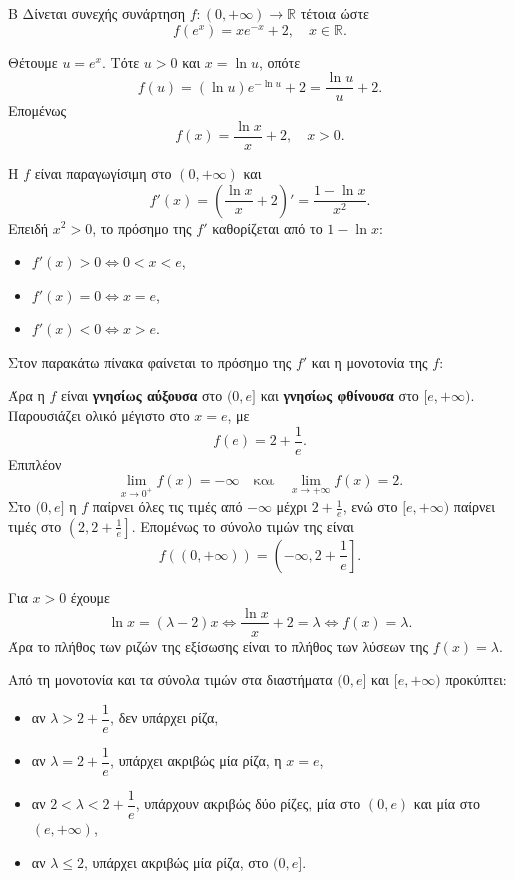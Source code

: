 
\begin{thema}{Β}
Δίνεται συνεχής συνάρτηση $f:(0,+\infty)\to\mathbb{R}$ τέτοια ώστε
\[
f(e^x)=xe^{-x}+2,\quad x\in\mathbb{R}.
\]

\begin{erwthma}
\item Θέτουμε $u=e^x$. Τότε $u>0$ και $x=\ln u$, οπότε
\[
f(u)=(\ln u)e^{-\ln u}+2=\frac{\ln u}{u}+2.
\]
Επομένως
\[
f(x)=\frac{\ln x}{x}+2,\quad x>0.
\]

\item Η $f$ είναι παραγωγίσιμη στο $(0,+\infty)$ και
\[
f'(x)=\left(\frac{\ln x}{x}+2\right)'=\frac{1-\ln x}{x^2}.
\]
Επειδή $x^2>0$, το πρόσημο της $f'$ καθορίζεται από το $1-\ln x$:
\begin{itemize}
\item $f'(x)>0\Leftrightarrow 0<x<e$,
\item $f'(x)=0\Leftrightarrow x=e$,
\item $f'(x)<0\Leftrightarrow x>e$.
\end{itemize}
Στον παρακάτω πίνακα φαίνεται το πρόσημο της $f'$ και η μονοτονία της $f$:
\begin{center}
\end{center}
Άρα η $f$ είναι \textbf{γνησίως αύξουσα} στο $(0,e]$ και \textbf{γνησίως φθίνουσα} στο $[e,+\infty)$. Παρουσιάζει ολικό μέγιστο στο $x=e$, με
\[
f(e)=2+\frac{1}{e}.
\]
Επιπλέον
\[
\lim_{x\to0^+}f(x)=-\infty
\quad\text{και}\quad
\lim_{x\to+\infty}f(x)=2.
\]
Στο $(0,e]$ η $f$ παίρνει όλες τις τιμές από $-\infty$ μέχρι $2+\frac{1}{e}$, ενώ στο $[e,+\infty)$ παίρνει τιμές στο $\left(2,2+\frac{1}{e}\right]$. Επομένως το σύνολο τιμών της είναι
\[
f((0,+\infty))=\left(-\infty,2+\frac{1}{e}\right].
\]

\item Για $x>0$ έχουμε
\[
\ln x=(\lambda-2)x
\Leftrightarrow \frac{\ln x}{x}+2=\lambda
\Leftrightarrow f(x)=\lambda.
\]
Άρα το πλήθος των ριζών της εξίσωσης είναι το πλήθος των λύσεων της $f(x)=\lambda$.

Από τη μονοτονία και τα σύνολα τιμών στα διαστήματα $(0,e]$ και $[e,+\infty)$ προκύπτει:
\begin{itemize}
\item αν $\lambda>2+\dfrac{1}{e}$, δεν υπάρχει ρίζα,
\item αν $\lambda=2+\dfrac{1}{e}$, υπάρχει ακριβώς μία ρίζα, η $x=e$,
\item αν $2<\lambda<2+\dfrac{1}{e}$, υπάρχουν ακριβώς δύο ρίζες, μία στο $(0,e)$ και μία στο $(e,+\infty)$,
\item αν $\lambda\leq2$, υπάρχει ακριβώς μία ρίζα, στο $(0,e]$.
\end{itemize}


\end{erwthma}
\end{thema}
